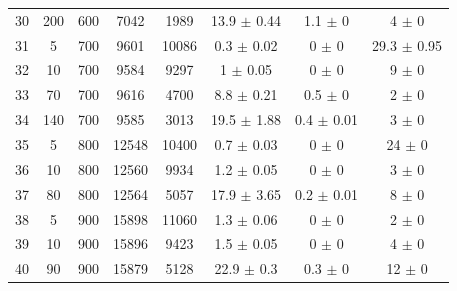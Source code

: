 \documentclass[11pt]{article}
\begin{document}
\begin{table}[]
{\begin{tabular}{cccccccc}
				30 & 200 & 600 & 7042 & 1989 & 13.9 $\pm$ 0.44 & 1.1 $\pm$ 0 & 4 $\pm$ 0 \\
				\rowcolor[HTML]{EFEFEF} 
				31 & 5 & 700 & 9601 & 10086 & 0.3 $\pm$ 0.02 & 0 $\pm$ 0 & 29.3 $\pm$ 0.95 \\
				\rowcolor[HTML]{EFEFEF} 
				32 & 10 & 700 & 9584 & 9297 & 1 $\pm$ 0.05 & 0 $\pm$ 0 & 9 $\pm$ 0 \\
				\rowcolor[HTML]{EFEFEF} 
				33 & 70 & 700 & 9616 & 4700 & 8.8 $\pm$ 0.21 & 0.5 $\pm$ 0 & 2 $\pm$ 0 \\
				\rowcolor[HTML]{EFEFEF} 
				34 & 140 & 700 & 9585 & 3013 & 19.5 $\pm$ 1.88 & 0.4 $\pm$ 0.01 & 3 $\pm$ 0 \\
				35 & 5 & 800 & 12548 & 10400 & 0.7 $\pm$ 0.03 & 0 $\pm$ 0 & 24 $\pm$ 0 \\
				36 & 10 & 800 & 12560 & 9934 & 1.2 $\pm$ 0.05 & 0 $\pm$ 0 & 3 $\pm$ 0 \\
				37 & 80 & 800 & 12564 & 5057 & 17.9 $\pm$ 3.65 & 0.2 $\pm$ 0.01 & 8 $\pm$ 0 \\
				\rowcolor[HTML]{EFEFEF} 
				38 & 5 & 900 & 15898 & 11060 & 1.3 $\pm$ 0.06 & 0 $\pm$ 0 & 2 $\pm$ 0 \\
				\rowcolor[HTML]{EFEFEF} 
				39 & 10 & 900 & 15896 & 9423 & 1.5 $\pm$ 0.05 & 0 $\pm$ 0 & 4 $\pm$ 0 \\
				\rowcolor[HTML]{EFEFEF} 
				40 & 90 & 900 & 15879 & 5128 & 22.9 $\pm$ 0.3 & 0.3 $\pm$ 0 & 12 $\pm$ 0
			\end{tabular}%
		}
	\end{table}
	
\end{document}
